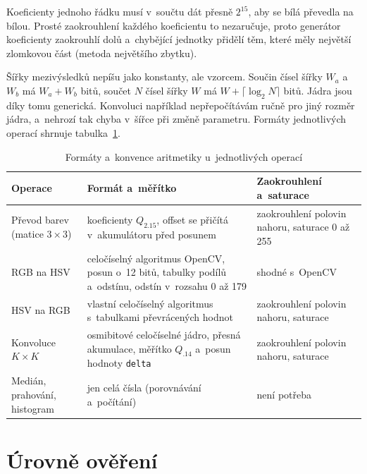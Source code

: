 Koeficienty jednoho řádku musí v~součtu dát přesně $2^{15}$, aby se bílá převedla na bílou. Prosté zaokrouhlení každého koeficientu to nezaručuje, proto generátor koeficienty zaokrouhlí dolů a~chybějící jednotky přidělí těm, které měly největší zlomkovou část (metoda největšího zbytku).

Šířky mezivýsledků nepíšu jako konstanty, ale vzorcem. Součin čísel šířky $W_a$ a~$W_b$ má $W_a + W_b$ bitů, součet $N$ čísel šířky $W$ má $W + \lceil \log_{2} N \rceil$ bitů. Jádra jsou díky tomu generická. Konvoluci například nepřepočítávám ručně pro jiný rozměr jádra, a~nehrozí tak chyba v~šířce při změně parametru. Formáty jednotlivých operací shrnuje tabulka~\ref{tab:formaty}.

\begin{table}[htbp]
    \centering
    \caption{Formáty a~konvence aritmetiky u~jednotlivých operací}
    \label{tab:formaty}
    \begin{tabular}{p{3.3cm}p{5.2cm}p{5.2cm}}
        \toprule
        Operace & Formát a~měřítko & Zaokrouhlení a~saturace \\
        \midrule
        Převod barev (matice 3\,×\,3) & koeficienty $Q_{2.15}$, offset se přičítá v~akumulátoru před posunem & zaokrouhlení polovin nahoru, saturace 0 až 255 \\
        RGB na HSV & celočíselný algoritmus OpenCV, posun o~12 bitů, tabulky podílů a~odstínu, odstín v~rozsahu 0 až 179 & shodné s~OpenCV \\
        HSV na RGB & vlastní celočíselný algoritmus s~tabulkami převrácených hodnot & zaokrouhlení polovin nahoru, saturace \\
        Konvoluce $K \times  K$ & osmibitové celočíselné jádro, přesná akumulace, měřítko $Q_{.14}$ a~posun hodnoty \texttt{delta} & zaokrouhlení polovin nahoru, saturace \\
        Medián, prahování, histogram & jen celá čísla (porovnávání a~počítání) & není potřeba \\
        \bottomrule
    \end{tabular}
\end{table}


\section{Úrovně ověření}
\label{sec:overeni}

